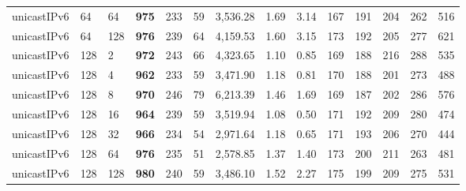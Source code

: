 \begin{table}[!htb]
\begin{tabular}{@{}llllllllllllll@{}}
unicastIPv6 & 64           & 64    & \textbf{975}  & 233  & 59  & 3,536.28 & 1.69     & 3.14     & 167 & 191 & 204 & 262 & 516  \\
unicastIPv6 & 64           & 128   & \textbf{976}  & 239  & 64  & 4,159.53 & 1.60     & 3.15     & 173 & 192 & 205 & 277 & 621  \\ \hline
unicastIPv6 & 128          & 2     & \textbf{972}  & 243  & 66  & 4,323.65 & 1.10     & 0.85     & 169 & 188 & 216 & 288 & 535  \\
unicastIPv6 & 128          & 4     & \textbf{962}  & 233  & 59  & 3,471.90 & 1.18     & 0.81     & 170 & 188 & 201 & 273 & 488  \\
unicastIPv6 & 128          & 8     & \textbf{970}  & 246  & 79  & 6,213.39 & 1.46     & 1.69     & 169 & 187 & 202 & 286 & 576  \\
unicastIPv6 & 128          & 16    & \textbf{964}  & 239  & 59  & 3,519.94 & 1.08     & 0.50     & 171 & 192 & 209 & 280 & 474  \\
unicastIPv6 & 128          & 32    & \textbf{966}  & 234  & 54  & 2,971.64 & 1.18     & 0.65     & 171 & 193 & 206 & 270 & 444  \\
unicastIPv6 & 128          & 64    & \textbf{976}  & 235  & 51  & 2,578.85 & 1.37     & 1.40     & 173 & 200 & 211 & 263 & 481  \\
unicastIPv6 & 128          & 128   & \textbf{980}  & 240  & 59  & 3,486.10 & 1.52     & 2.27     & 175 & 199 & 209 & 275 & 531  \\ \bottomrule
\end{tabular}
\end{table}


